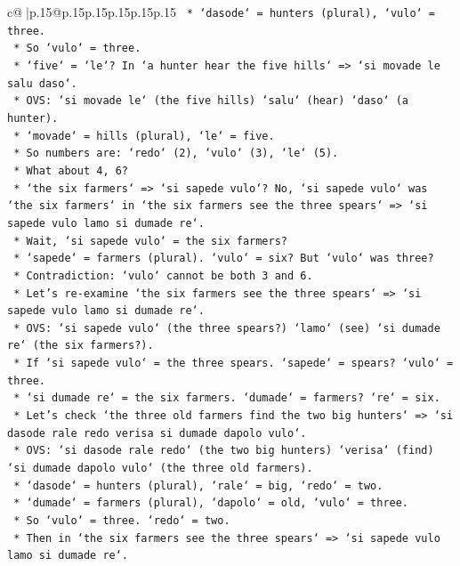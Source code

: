\documentclass{article}
\begin{document}
{\begin{supertabular}{c@{$\;$}|p{.15\linewidth}@{}p{.15\linewidth}p{.15\linewidth}p{.15\linewidth}p{.15\linewidth}p{.15\linewidth}}
{{{\texttt{    *   `dasode` = hunters (plural), `vulo` = three.} \\
\texttt{    *   So `vulo` = three.} \\
\texttt{    *   `five` = `le`? In `a hunter hear the five hills` => `si movade le salu daso`.} \\
\texttt{    *   OVS: `si movade le` (the five hills) `salu` (hear) `daso` (a hunter).} \\
\texttt{    *   `movade` = hills (plural), `le` = five.} \\
\texttt{    *   So numbers are: `redo` (2), `vulo` (3), `le` (5).} \\
\texttt{    *   What about 4, 6?} \\
\texttt{    *   `the six farmers` => `si sapede vulo`? No, `si sapede vulo` was `the six farmers` in `the six farmers see the three spears` => `si sapede vulo lamo si dumade re`.} \\
\texttt{    *   Wait, `si sapede vulo` = the six farmers?} \\
\texttt{    *   `sapede` = farmers (plural). `vulo` = six? But `vulo` was three?} \\
\texttt{    *   Contradiction: `vulo` cannot be both 3 and 6.} \\
\texttt{    *   Let's re{-}examine `the six farmers see the three spears` => `si sapede vulo lamo si dumade re`.} \\
\texttt{    *   OVS: `si sapede vulo` (the three spears?) `lamo` (see) `si dumade re` (the six farmers?).} \\
\texttt{    *   If `si sapede vulo` = the three spears. `sapede` = spears? `vulo` = three.} \\
\texttt{    *   `si dumade re` = the six farmers. `dumade` = farmers? `re` = six.} \\
\texttt{    *   Let's check `the three old farmers find the two big hunters` => `si dasode rale redo verisa si dumade dapolo vulo`.} \\
\texttt{    *   OVS: `si dasode rale redo` (the two big hunters) `verisa` (find) `si dumade dapolo vulo` (the three old farmers).} \\
\texttt{    *   `dasode` = hunters (plural), `rale` = big, `redo` = two.} \\
\texttt{    *   `dumade` = farmers (plural), `dapolo` = old, `vulo` = three.} \\
\texttt{    *   So `vulo` = three. `redo` = two.} \\
\texttt{    *   Then in `the six farmers see the three spears` => `si sapede vulo lamo si dumade re`.} \\
}}}
\end{supertabular}}
\end{document}
